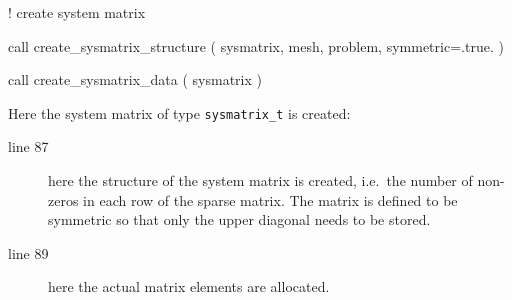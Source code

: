 \begin{listingcont}
! create system matrix
                                                                                
  call create_sysmatrix_structure ( sysmatrix, mesh, problem, symmetric=.true. )
                                                                                
  call create_sysmatrix_data ( sysmatrix )
                                                                                
\end{listingcont}
Here the system matrix of type \texttt{sysmatrix\_t} is created:
\begin{description}
   \item[line 87] here the structure of the system matrix is created, i.e.\ the
     number of non-zeros in each row of the sparse matrix. The matrix is
defined to be symmetric so that only the upper diagonal needs to be stored.
   \item[line 89] here the actual matrix elements are allocated. 
\end{description}

